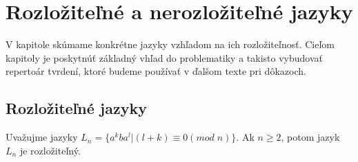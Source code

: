 \chapter[Rozložiteľné a nerozložiteľné jazyky]{Rozložiteľné a nerozložiteľné jazyky}
\label{kap:languages}

V kapitole skúmame konkrétne jazyky vzhľadom na ich rozložiteľnosť. Cieľom kapitoly je poskytnúť základný vhľad do problematiky a takisto vybudovať repertoár tvrdení, ktoré budeme používať v ďalšom texte pri dôkazoch.

\section{Rozložiteľné jazyky}

\begin{proposition}
Uvažujme jazyky $ L_{n} = \lbrace a^{k}ba^{l} | (l+k) \equiv 0 (mod \; n) \rbrace $. Ak $ n \geq 2 $, potom jazyk $ L_n $ je rozložiteľný.
\end{proposition}

